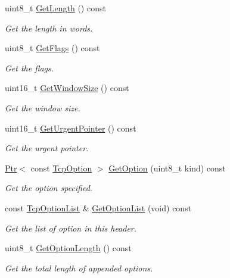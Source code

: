 \begin{DoxyCompactItemize}
uint8\+\_\+t \hyperlink{classns3_1_1TcpHeader_a957928d2dd1108dc1ef8c38daecdcf62}{Get\+Length} () const 
\begin{DoxyCompactList}\small\item\em Get the length in words. \end{DoxyCompactList}\item 
uint8\+\_\+t \hyperlink{classns3_1_1TcpHeader_a0d04c5620ee147d4e01d56b9530e8db1}{Get\+Flags} () const 
\begin{DoxyCompactList}\small\item\em Get the flags. \end{DoxyCompactList}\item 
uint16\+\_\+t \hyperlink{classns3_1_1TcpHeader_aa6adcd54e5b13941acdf6328cecc9b29}{Get\+Window\+Size} () const 
\begin{DoxyCompactList}\small\item\em Get the window size. \end{DoxyCompactList}\item 
uint16\+\_\+t \hyperlink{classns3_1_1TcpHeader_a0ab999506e0654e327abfcf66740cc5c}{Get\+Urgent\+Pointer} () const 
\begin{DoxyCompactList}\small\item\em Get the urgent pointer. \end{DoxyCompactList}\item 
\hyperlink{classns3_1_1Ptr}{Ptr}$<$ const \hyperlink{classns3_1_1TcpOption}{Tcp\+Option} $>$ \hyperlink{classns3_1_1TcpHeader_aa4f3b9c1f7f243f9496e1216ac4fe022}{Get\+Option} (uint8\+\_\+t kind) const 
\begin{DoxyCompactList}\small\item\em Get the option specified. \end{DoxyCompactList}\item 
const \hyperlink{classns3_1_1TcpHeader_ac28e919e2a5be37ada2b8f06cb0c4d4a}{Tcp\+Option\+List} \& \hyperlink{classns3_1_1TcpHeader_a2e6350eefb34d1cf9be219d33dae64d4}{Get\+Option\+List} (void) const 
\begin{DoxyCompactList}\small\item\em Get the list of option in this header. \end{DoxyCompactList}\item 
uint8\+\_\+t \hyperlink{classns3_1_1TcpHeader_a60a2f9b6bf273dd10646afba6c205fec}{Get\+Option\+Length} () const 
\begin{DoxyCompactList}\small\item\em Get the total length of appended options. \end{DoxyCompactList}\item 

\end{DoxyCompactItemize}
